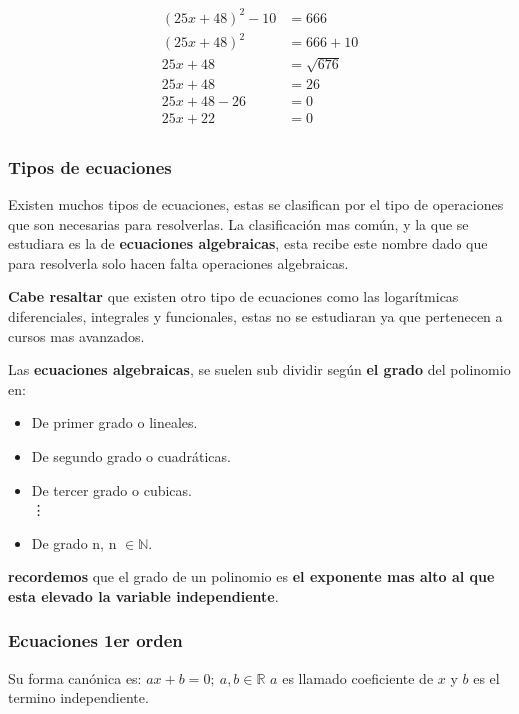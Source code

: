\documentclass[12pt]{article}
\begin{document}
    \begin{align*}
        (25x + 48)^2 -10 &= 666 \\
        (25x + 48)^2  &= 666+10 \\
        25x +48 &= \sqrt{676}\\
        25x + 48 &= 26 \\
        25x +48 -26 &= 0 \\
        25x+22 &= 0\\
    \end{align*}

\subsubsection{Tipos de ecuaciones}
    Existen muchos tipos de ecuaciones, estas se clasifican por el tipo de operaciones
    que son necesarias para resolverlas. La clasificación mas común, y la que se
    estudiara es la de \textbf{ecuaciones algebraicas}, esta recibe este nombre
    dado que para resolverla solo hacen falta operaciones algebraicas.

    \textbf{Cabe resaltar} que existen otro tipo de ecuaciones como las logarítmicas
    diferenciales, integrales y funcionales, estas no se estudiaran ya que
    pertenecen a cursos mas avanzados.

    Las \textbf{ecuaciones algebraicas}, se suelen sub dividir según \textbf{el
    grado} del polinomio en:

    \begin{itemize}
        \item De primer grado o lineales.
        \item De segundo grado o cuadráticas.
        \item De tercer grado o cubicas.\\
        \vdots
        \item De grado n, n $\in\mathbb{N}$.
    \end{itemize}
    \textbf{recordemos} que el grado de un polinomio es
    \textbf{el exponente mas alto al que esta elevado la variable independiente}.

    \subsubsection*{Ecuaciones 1er orden} \label{Ecuaciones-1er-orden}
    Su forma canónica es: $ax+b=0;\ a,b\in\mathbb{R}$ $a$ es llamado coeficiente
    de $x$ y $b$ es el termino independiente.
\end{document}
